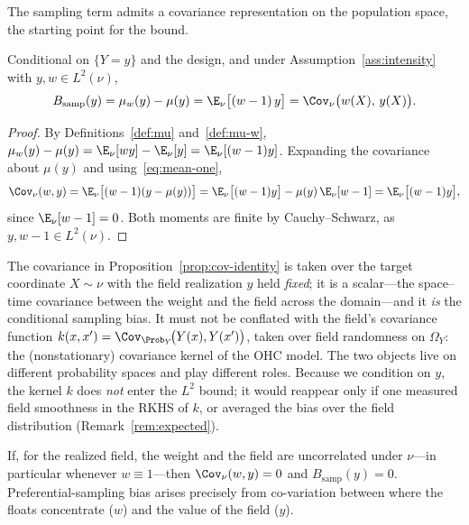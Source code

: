 The sampling term admits a covariance representation on the population
space, the starting point for the bound.

\begin{proposition}
\label{prop:cov-identity}
Conditional on $\{Y=y\}$ and the design, and under
Assumption~\ref{ass:intensity} with $y,w\in L^2(\nu)$,
\[
  B_{\mathrm{samp}}(y) = \mu_w(y) - \mu(y)
  = \E_\nu\big[(w-1)\,y\big]
  = \Cov_\nu\big(w(X),\,y(X)\big).
\]
\end{proposition}

\begin{proof}
By Definitions~\ref{def:mu} and~\ref{def:mu-w},
$\mu_w(y)-\mu(y)=\E_\nu[wy]-\E_\nu[y]=\E_\nu[(w-1)y]$. Expanding the
covariance about $\mu(y)$ and using~\eqref{eq:mean-one},
\[
  \Cov_\nu(w,y)
  = \E_\nu\big[(w-1)(y-\mu(y))\big]
  = \E_\nu\big[(w-1)y\big] - \mu(y)\,\E_\nu[w-1]
  = \E_\nu\big[(w-1)y\big],
\]
since $\E_\nu[w-1]=0$. Both moments are finite by Cauchy--Schwarz, as
$y,w-1\in L^2(\nu)$.
\end{proof}

\begin{remark}
\label{rem:two-cov}
The covariance in Proposition~\ref{prop:cov-identity} is taken over the
target coordinate $X\sim\nu$ with the field realization $y$ held
\emph{fixed}; it is a scalar---the space--time covariance between the
weight and the field across the domain---and it \emph{is} the
conditional sampling bias. It must not be conflated with the field's
covariance function
$k(x,x') = \Cov_{\Prob_Y}\!\big(Y(x),Y(x')\big)$, taken over field
randomness on $\Omega_Y$: the (nonstationary) covariance kernel of the
OHC model. The two objects live on different probability spaces and
play different roles. Because we condition on $y$, the kernel $k$ does
\emph{not} enter the $L^2$ bound; it would reappear only if one
measured field smoothness in the RKHS of $k$, or averaged the bias over
the field distribution (Remark~\ref{rem:expected}).
\end{remark}

\begin{remark}
\label{rem:zero-bias}
If, for the realized field, the weight and the field are uncorrelated
under $\nu$---in particular whenever $w\equiv1$---then
$\Cov_\nu(w,y)=0$ and $B_{\mathrm{samp}}(y)=0$. Preferential-sampling
bias arises precisely from co-variation between where the floats
concentrate ($w$) and the value of the field ($y$).
\end{remark}

